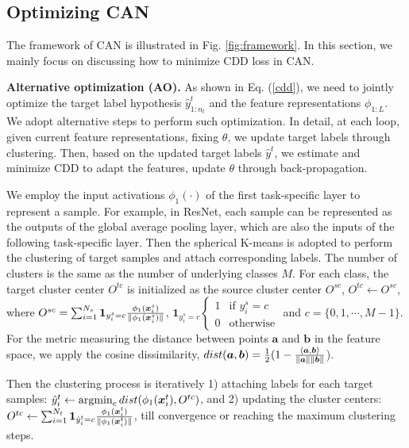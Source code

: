 \documentclass[10pt,twocolumn,letterpaper]{article}
\DeclarePairedDelimiter{\norm}{\lVert}{\rVert}
\DeclareMathOperator*{\argmin}{argmin} \DeclareMathOperator*{\argmax}{argmax}
\begin{document}
\subsection{Optimizing CAN} \label{sec:can_training}
The framework of CAN is illustrated in Fig. \ref{fig:framework}.
In this section, we mainly focus on discussing how to minimize CDD loss in CAN.


\textbf{Alternative optimization (AO).}
As shown in Eq. (\ref{cdd}),
we need to jointly optimize the target label hypothesis $\hat{y}^t_{1:n_t}$
and the feature representations $\phi_{1:L}$.
We adopt alternative steps to perform such optimization.
In detail, at each loop, given current feature representations, \ie fixing $\theta$, 
we update target labels through clustering.
Then, based on the updated target labels $\hat{y}^t$, 
we estimate and minimize CDD to adapt the features, 
\ie update $\theta$ through back-propagation.

We employ the input activations $\phi_1(\cdot)$ of the first task-specific layer 
to represent a sample.
For example, in ResNet, each sample can be  
represented as the outputs of the global average pooling layer,
which are also the inputs of the following task-specific layer.
Then the spherical K-means is adopted to perform the clustering of target samples and 
attach corresponding labels. 
The number of clusters is the same as the number of underlying classes $M$. 
For each class,
the target cluster center $O^{tc}$ is initialized as the  
source cluster center $O^{sc}$, \ie
$O^{tc} \gets O^{sc}$, 
where
$O^{sc} = \sum_{i=1}^{N_{s}}\mathbf{1}_{y^s_{i}=c}
\frac{\phi_{1}(\x^s_{i})}{\norm{\phi_{1}(\x^s_{i})}}$,
$\mathbf{1}_{y_i^s=c}
\left\{ \begin{array}{ll}
         1 & \mbox{if $y_i^s=c$}\\
         0 & \mbox{otherwise}\end{array} \right. $
and $c=\{0, 1, \cdots, M-1\}$. 
For the metric measuring the distance between points $\boldsymbol{a}$ and $\boldsymbol{b}$ 
in the feature space,
we apply the cosine dissimilarity, \ie
$dist(\boldsymbol{a}, \boldsymbol{b}) = 
\frac{1}{2}(1 - \frac{\langle \boldsymbol{a}, \boldsymbol{b} \rangle}
{\norm{\boldsymbol{a}}\norm{\boldsymbol{b}}}$).

Then the clustering process is iteratively 
1) attaching labels for each target samples:
$\hat{y}^t_i \gets \argmin_c {dist(\phi_{1}(\x^t_i), O^{tc}})$,
and
2) updating the cluster centers: 
$O^{tc} \gets \sum_{i=1}^{N_{t}}{\mathbf{1}_{\hat{y}^t_{i}=c} \frac{\phi_{1}(\x^t_{i})}{\norm{\phi_{1}(\x^t_{i})}}}$,
till convergence or reaching the maximum clustering steps.
\end{document}
